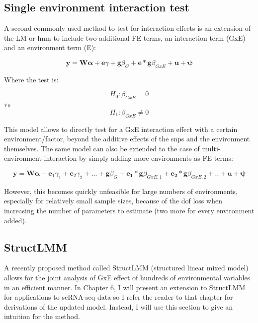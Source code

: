 \subsection{Single environment interaction test}

A second commonly used method to test for interaction effects is an extension of the LM or \gls{lmm} to include two additional FE terms, an interaction term (GxE) and an environment term (E):

\begin{equation}\label{eq:Interaction_test_FE_LMM}
 \mathbf{y} =  \mathbf{W}\boldsymbol{\alpha} + \mathbf{e}\gamma  + \mathbf{g}\beta_G + \mathbf{e}*\mathbf{g}\beta_{GxE} + \mathbf{u} + \boldsymbol{\psi} 
\end{equation}

Where the test is:

\begin{equation}
 H_{0}: \beta_{GxE}=0 
\end{equation}
vs
\begin{equation}
 H_{1}: \beta_{GxE} \neq 0 
\end{equation}

This model allows to directly test for a GxE interaction effect with a certain environment/factor, beyond the additive effects of the \gls{snps} and the environment themselves. 
The same model can also be extended to the case of multi-environment interaction by simply adding more environments as FE terms:

\begin{equation}\label{eq:multi_interaction_test_FE_LMM}
 \mathbf{y} =  \mathbf{W}\boldsymbol{\alpha} + \mathbf{e}_1\gamma_1 + \mathbf{e}_2\gamma_2 + ...  + \mathbf{g}\beta_G + \mathbf{e_1}*\mathbf{g}\beta_{GxE,1}+ \mathbf{e_2}*\mathbf{g}\beta_{GxE,2} + .. + \mathbf{u} + \boldsymbol{\psi} 
\end{equation}

However, this becomes quickly unfeasible for large numbers of environments, especially for relatively small sample sizes, because of the dof loss when increasing the number of parameters to estimate (two more for every environment added).


\subsection{StructLMM}

A recently proposed method called StructLMM (structured linear mixed model) allows for the joint analysis of GxE effect of hundreds of environmental variables \cite{moore2019linear} in an efficient manner.
In Chapter 6, I will present an extension to StructLMM for applications to scRNA-seq data so I refer the reader to that chapter for derivations of the updated model.
Instead, I will use this section to give an intuition for the method.\\

